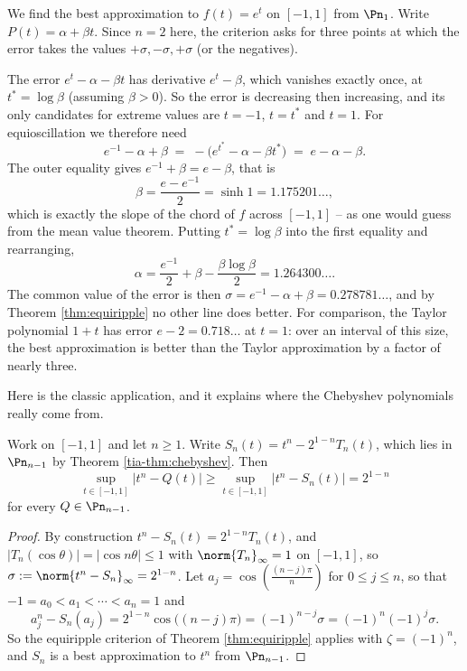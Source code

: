 \begin{example}
	We find the best approximation to $f(t) = e^t$ on $[-1,1]$ from $\Pn_1$. Write $P(t) = \alpha+\beta t$. Since $n = 2$ here, the criterion asks for three points at which the error takes the values $+\sigma,-\sigma,+\sigma$ (or the negatives).

	The error $e^t - \alpha-\beta t$ has derivative $e^t - \beta$, which vanishes exactly once, at $t^* = \log\beta$ (assuming $\beta>0$). So the error is decreasing then increasing, and its only candidates for extreme values are $t = -1$, $t = t^*$ and $t=1$. For equioscillation we therefore need
	$$e^{-1}-\alpha+\beta \;=\; -\big(e^{t^*}-\alpha-\beta t^*\big) \;=\; e - \alpha-\beta.$$
	The outer equality gives $e^{-1}+\beta = e - \beta$, that is
	$$\beta = \frac{e-e^{-1}}{2} = \sinh 1 = 1.175201\ldots,$$
	which is exactly the slope of the chord of $f$ across $[-1,1]$ -- as one would guess from the mean value theorem. Putting $t^*=\log\beta$ into the first equality and rearranging,
	$$\alpha = \frac{e^{-1}}{2}+\beta-\frac{\beta\log\beta}{2} = 1.264300\ldots.$$
	The common value of the error is then $\sigma = e^{-1}-\alpha+\beta = 0.278781\ldots$, and by Theorem \ref{thm:equiripple} no other line does better. For comparison, the Taylor polynomial $1+t$ has error $e-2 = 0.718\ldots$ at $t=1$: over an interval of this size, the best approximation is better than the Taylor approximation by a factor of nearly three.
\end{example}

Here is the classic application, and it explains where the Chebyshev polynomials really come from.

\begin{theorem}\label{thm:best-approx-tn}
	Work on $[-1,1]$ and let $n\geq1$. Write $S_n(t) = t^n - 2^{1-n}T_n(t)$, which lies in $\Pn_{n-1}$ by Theorem \ref{tia-thm:chebyshev}. Then
	$$\sup_{t\in[-1,1]}|t^n - Q(t)| \geq \sup_{t\in[-1,1]}|t^n-S_n(t)| = 2^{1-n}$$
	for every $Q\in\Pn_{n-1}$.
\end{theorem}

\begin{proof}
	By construction $t^n - S_n(t) = 2^{1-n}T_n(t)$, and $|T_n(\cos\theta)| = |\cos n\theta|\leq1$ with $\norm{T_n}_\infty=1$ on $[-1,1]$, so $\sigma := \norm{t^n - S_n}_\infty = 2^{1-n}$. Let $a_j = \cos\left(\frac{(n-j)\pi}{n}\right)$ for $0\leq j \leq n$, so that $-1 = a_0<a_1<\cdots<a_n = 1$ and
	$$a_j^n - S_n(a_j) = 2^{1-n}\cos\big((n-j)\pi\big) = (-1)^{n-j}\sigma = (-1)^n(-1)^j\sigma.$$
	So the equiripple criterion of Theorem \ref{thm:equiripple} applies with $\zeta = (-1)^n$, and $S_n$ is a best approximation to $t^n$ from $\Pn_{n-1}$.
\end{proof}

